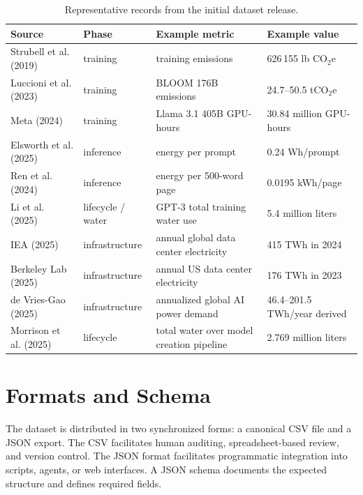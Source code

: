 \documentclass[11pt,a4paper]{article}
\begin{document}
\begin{table}[htbp]
\centering
\small
\begin{tabularx}{\textwidth}{|L{2.7cm}|L{2.2cm}|L{2.1cm}|Y|}
\hline
Source & Phase & Example metric & Example value \\
\hline
Strubell et al. (2019) \cite{strubell2019} & training & training emissions & 626\,155 lb CO$_2$e \\
\hline
Luccioni et al. (2023) \cite{luccioni2023} & training & BLOOM 176B emissions & 24.7--50.5 tCO$_2$e \\
\hline
Meta (2024) \cite{meta2024llama} & training & Llama 3.1 405B GPU-hours & 30.84 million GPU-hours \\
\hline
Elsworth et al. (2025) \cite{elsworth2025} & inference & energy per prompt & 0.24 Wh/prompt \\
\hline
Ren et al. (2024) \cite{ren2024} & inference & energy per 500-word page & 0.0195 kWh/page \\
\hline
Li et al. (2025) \cite{li2025water} & lifecycle / water & GPT-3 total training water use & 5.4 million liters \\
\hline
IEA (2025) \cite{iea2025} & infrastructure & annual global data center electricity & 415 TWh in 2024 \\
\hline
Berkeley Lab (2025) \cite{lbl2025} & infrastructure & annual US data center electricity & 176 TWh in 2023 \\
\hline
de Vries-Gao (2025) \cite{devriesgao2025joule} & infrastructure & annualized global AI power demand & 46.4--201.5 TWh/year derived \\
\hline
Morrison et al. (2025) \cite{morrison2025} & lifecycle & total water over model creation pipeline & 2.769 million liters \\
\hline
\end{tabularx}
\caption{Representative records from the initial dataset release.}
\label{tab:dataset-overview}
\end{table}

\section{Formats and Schema}
The dataset is distributed in two synchronized forms: a canonical CSV file and a JSON export. The CSV facilitates human auditing, spreadsheet-based review, and version control. The JSON format facilitates programmatic integration into scripts, agents, or web interfaces. A JSON schema documents the expected structure and defines required fields.
\end{document}
